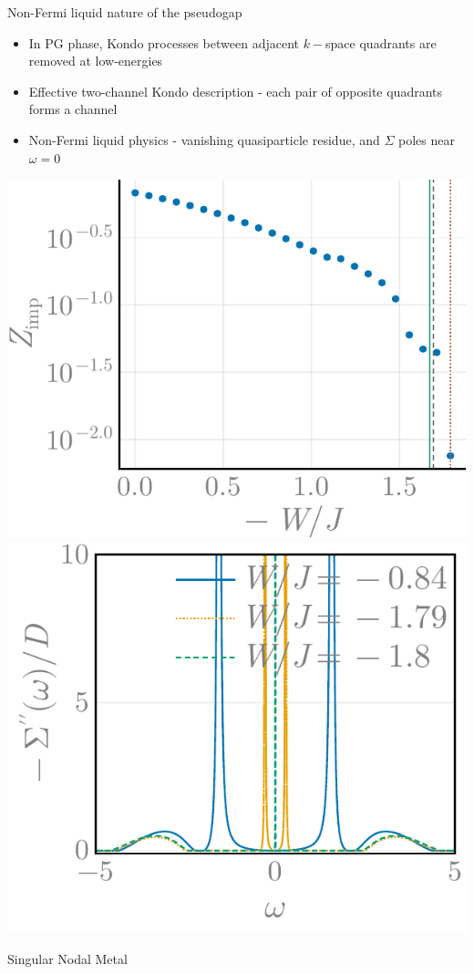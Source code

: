 \documentclass[10pt,aspectratio=169]{beamer}
\begin{document}
\begin{frame}{Non-Fermi liquid nature of the pseudogap}
	\begin{itemize}
		\item In PG phase, Kondo processes between adjacent \(k-\)space quadrants are removed at low-energies
		\item Effective \alert{two-channel Kondo} description - each pair of opposite quadrants forms a channel
		\item \alert{Non-Fermi liquid} physics - vanishing quasiparticle residue, and \(\Sigma\) poles near \(\omega=0\)
	\end{itemize}
	
\vspace{-5pt}
\begin{center}
    \includegraphics[width=0.4\linewidth]{localQPResidue.pdf}
    \includegraphics[width=0.4\linewidth]{sigmaImag_49-1000.pdf}
\end{center}
\end{frame}

\begin{frame}{Singular Nodal Metal}

\end{frame}
\end{document}
